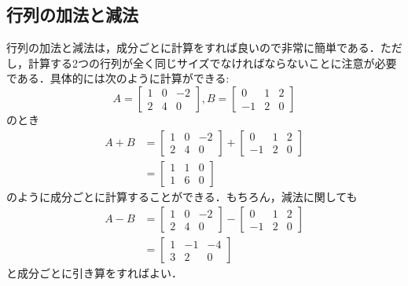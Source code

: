 \documentclass[a4paper,12pt,autodetect-engine,dvipdfmx]{jsarticle}
\theoremstyle{definition}
\begin{document}
\subsection{行列の加法と減法}
行列の加法と減法は，成分ごとに計算をすれば良いので非常に簡単である．ただし，計算する2つの行列が全く同じサイズでなければならないことに注意が必要である．具体的には次のように計算ができる:
\begin{equation*}
    A = \begin{bmatrix}
        1 & 0 & -2 \\
        2 & 4 & 0
    \end{bmatrix},
    B = \begin{bmatrix}
        0 & 1 & 2 \\
        -1 & 2 & 0
    \end{bmatrix}
\end{equation*}
のとき
\begin{align*}
    A+B &=
    \begin{bmatrix}
        1 & 0 & -2 \\
        2 & 4 & 0
    \end{bmatrix}
    +
    \begin{bmatrix}
        0 & 1 & 2 \\
        -1 & 2 & 0
    \end{bmatrix}\\
    &=
    \begin{bmatrix}
        1 & 1 & 0\\
        1 & 6 & 0
    \end{bmatrix}
\end{align*}
のように成分ごとに計算することができる．もちろん，減法に関しても
\begin{align*}
    A-B &=
    \begin{bmatrix}
        1 & 0 & -2 \\
        2 & 4 & 0
    \end{bmatrix}
    -
    \begin{bmatrix}
        0 & 1 & 2 \\
        -1 & 2 & 0
    \end{bmatrix}\\
    &=
    \begin{bmatrix}
        1 & -1 & -4\\
        3 & 2 & 0
    \end{bmatrix}
\end{align*}
と成分ごとに引き算をすればよい．
\end{document}
